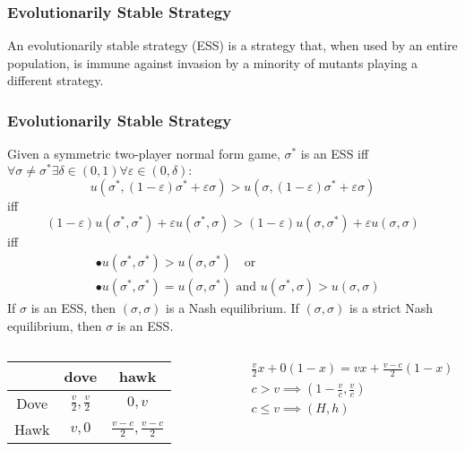 \documentclass[UTF8,11pt,colorlinks,compress,openany]{beamer}%
\begin{document}
\begin{frame}\frametitle{Evolutionarily Stable Strategy}
\begin{block}{}
An evolutionarily stable strategy (ESS) is a strategy that, when used by an entire population, is immune against invasion by a minority of mutants playing a different strategy.
\end{block}
\end{frame}

\begin{frame}\frametitle{Evolutionarily Stable Strategy}
Given a symmetric two-player normal form game, $\sigma^*$ is an ESS iff $\forall \sigma\neq \sigma^*\exists\delta\in(0,1)\forall\varepsilon\in(0,\delta):$
	\[u\left(\sigma^*,(1-\varepsilon)\sigma^*+\varepsilon \sigma\right)>u\left(\sigma,(1-\varepsilon)\sigma^*+\varepsilon \sigma\right)\]
	iff
	\[(1-\varepsilon)u\left(\sigma^*,\sigma^*\right)+\varepsilon u\left(\sigma^*,\sigma\right)>(1-\varepsilon)u\left(\sigma,\sigma^*\right)+\varepsilon u\left(\sigma,\sigma\right)\]
	iff
	\begin{align*}
	&\bullet u\left(\sigma^*,\sigma^*\right)>u\left(\sigma,\sigma^*\right)\quad\mbox{or}\\
	&\bullet u\left(\sigma^*,\sigma^*\right)=u\left(\sigma,\sigma^*\right)\mbox{ and } u\left(\sigma^*,\sigma\right)>u\left(\sigma,\sigma\right)
	\end{align*}
	If $\sigma$ is an ESS, then $(\sigma,\sigma)$ is a Nash equilibrium. If $(\sigma,\sigma)$ is a strict Nash equilibrium, then $\sigma$ is an ESS.
\begin{columns}
\begin{table}
\abovetabulinesep=1mm
\belowtabulinesep=1mm
\begin{tabu}{c|cc}
\hline
 & dove & hawk\\
\hline
Dove & $\frac{v}{2},\frac{v}{2}$ & $0,v$\\
Hawk & $v,0$ & $\frac{v-c}{2},\frac{v-c}{2}$\\
\hline
\end{tabu}
\end{table}
\vspace{-3ex}
\begin{align*}
&\frac{v}{2}x+0(1-x)=vx+\frac{v-c}{2}(1-x)\\
&c>v\implies(1-\frac{v}{c},\frac{v}{c})\\
&c\leq v\implies(H,h)
\end{align*}
\end{columns}
\end{frame}
\end{document}
